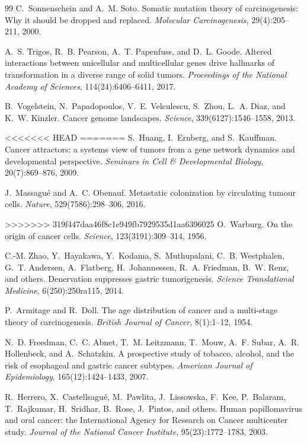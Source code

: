 \documentclass[11pt]{article}
\theoremstyle{definition}
\theoremstyle{remark}
\begin{document}
\begin{thebibliography}{99}
C.~Sonnenschein and A.~M. Soto.
\newblock Somatic mutation theory of carcinogenesis: Why it should be dropped
  and replaced.
\newblock \emph{Molecular Carcinogenesis}, 29(4):205--211, 2000.

A.~S. Trigos, R.~B. Pearson, A.~T. Papenfuss, and D.~L. Goode.
\newblock Altered interactions between unicellular and multicellular genes
  drive hallmarks of transformation in a diverse range of solid tumors.
\newblock \emph{Proceedings of the National Academy of Sciences},
  114(24):6406--6411, 2017.

B.~Vogelstein, N.~Papadopoulos, V.~E. Velculescu, S.~Zhou, L.~A. Diaz, and
  K.~W. Kinzler.
\newblock Cancer genome landscapes.
\newblock \emph{Science}, 339(6127):1546--1558, 2013.

<<<<<<< HEAD
=======
S.~Huang, I.~Ernberg, and S.~Kauffman.
\newblock Cancer attractors: a systems view of tumors from a gene network
  dynamics and developmental perspective.
\newblock \emph{Seminars in Cell \& Developmental Biology}, 20(7):869--876,
  2009.

J.~Massagu{\'e} and A.~C. Obenauf.
\newblock Metastatic colonization by circulating tumour cells.
\newblock \emph{Nature}, 529(7586):298--306, 2016.

>>>>>>> 319f447daa46f8c1e949fb7929535d1aa6396025
O.~Warburg.
\newblock On the origin of cancer cells.
\newblock \emph{Science}, 123(3191):309--314, 1956.

C.-M. Zhao, Y.~Hayakawa, Y.~Kodama, S.~Muthupalani, C.~B. Westphalen,
  G.~T. Andersen, A.~Flatberg, H.~Johannessen, R.~A. Friedman,
  B.~W. Renz, and others.
\newblock Denervation suppresses gastric tumorigenesis.
\newblock \emph{Science Translational Medicine}, 6(250):250ra115, 2014.

P.~Armitage and R.~Doll.
\newblock The age distribution of cancer and a multi-stage theory of
  carcinogenesis.
\newblock \emph{British Journal of Cancer}, 8(1):1--12, 1954.

N.~D. Freedman, C.~C. Abnet, T.~M. Leitzmann, T.~Mouw, A.~F. Subar,
  A.~R. Hollenbeck, and A.~Schatzkin.
\newblock A prospective study of tobacco, alcohol, and the risk of
  esophageal and gastric cancer subtypes.
\newblock \emph{American Journal of Epidemiology}, 165(12):1424--1433, 2007.

R.~Herrero, X.~Castellsagu{\'e}, M.~Pawlita, J.~Lissowska,
  F.~Kee, P.~Balaram, T.~Rajkumar, H.~Sridhar, B.~Rose,
  J.~Pintos, and others.
\newblock Human papillomavirus and oral cancer: the International
  Agency for Research on Cancer multicenter study.
\newblock \emph{Journal of the National Cancer Institute},
  95(23):1772--1783, 2003.


\end{thebibliography}
\end{document}

